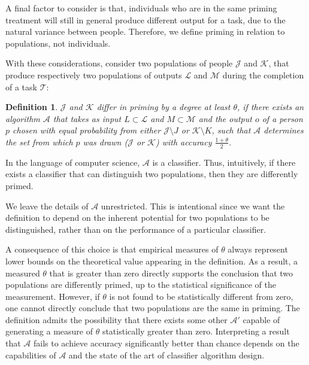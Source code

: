 \documentclass[a4paper]{report}
\newtheorem*{mydef}{Definition}
\begin{document}
A final factor to consider is that, individuals who are in the same priming 
treatment will still in general produce different output for a task,
due to the natural variance between people.  Therefore, we define priming in 
relation 
to populations, not individuals.

With these considerations, consider two populations of people 
$\mathcal{J}$ and $\mathcal{K}$, that produce respectively two populations of 
outputs $\mathcal{L}$ and $\mathcal{M}$ during the completion of a task 
$\mathcal{T}$: 

\vspace{2mm}
\begin{mydef}
	\upshape
	$\mathcal{J}$ and $\mathcal{K}$ 
	\emph{differ in priming by a degree at least $\theta$},
	if there exists an algorithm $\mathcal{A}$ that takes as input 
	$L \subset \mathcal{L}$ and $M \subset \mathcal{M}$ and the output 
	$o$ of a person $p$ chosen with equal probability from either 
	$\mathcal{J}\setminus J$ or $\mathcal{K}\setminus K$, 
	such that $\mathcal{A}$ determines the set from which $p$ was drawn
	($\mathcal{J}$ or $\mathcal{K}$) with accuracy $\frac{1+\theta}{2}$.  
\end{mydef}

In the language of computer science, $\mathcal{A}$ is a classifier.  Thus,
intuitively, if there exists a classifier that can distinguish two populations,
then they are differently primed.

We leave the details of $\mathcal{A}$ unrestricted.  This is 
intentional since we want the definition to depend on the inherent 
potential for two populations to be distinguished, rather than on the 
performance of a particular classifier.

A consequence of this choice is that empirical measures of $\theta$ always
represent lower bounds on the theoretical value appearing in the definition.
As a result, a measured $\theta$ that is greater than zero directly 
supports the conclusion that two populations are differently 
primed, up to the statistical significance of the measurement.  However, if 
$\theta$ is not found to be statistically different from zero, one cannot 
directly
conclude that two populations are the same in priming.  The definition
admits the possibility that there exists some other $\mathcal{A}'$ capable of 
generating a measure of $\theta$ statistically greater than zero. 
Interpreting a result
that $\mathcal{A}$ fails to achieve accuracy significantly better than 
chance depends on the capabilities of $\mathcal{A}$ and the state of the art
of classifier algorithm design.
\end{document}
